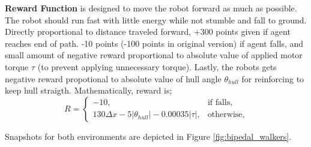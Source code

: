 \documentclass[a4paper, 12pt]{article} %
\begin{document}
\textbf{Reward Function} is designed to move the robot forward as much as possible.
The robot should run fast with little energy while not stumble and fall to ground. 
Directly proportional to distance traveled forward, +300 points given if agent reaches end of path. 
-10 points (-100 points in original version) if agent falls, 
and small amount of negative reward proportional to absolute value of applied motor torque $\tau$ (to prevent applying unnecessary torque). 
Lastly, the robots gets negative reward propotional to absolute value of hull angle $\theta_{hull}$ for reinforcing to keep hull straigth. 
Mathematically, reward is;
\begin{equation}
\label{eqn:reward_fcn}
R = 
\begin{cases}
-10,   & \text{if falls} ,\\
130 \Delta x -5 |\theta_{hull}| - 0.00035 |\tau|,   & \text{otherwise},
\end{cases}
\end{equation}

Snapshots for both environments are depicted in Figure \ref{fig:bipedal_walkers}.
\end{document}
